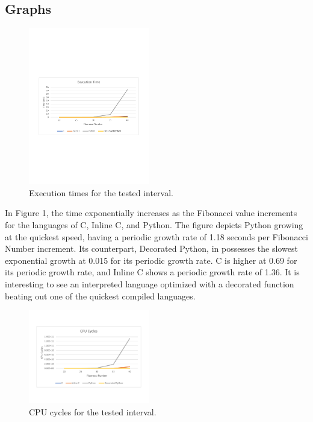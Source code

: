 \documentclass{sig-alternate}
\begin{document}
\subsection{Graphs}

\begin{figure}[h!]
	\centering
		\includegraphics[width=0.47\textwidth] {ExeTime.pdf}
	\caption{Execution times for the tested interval.}
	\label{Exe Times}
\end{figure}

In Figure 1, the time exponentially increases as the Fibonacci value increments for the languages of C, Inline C, and Python. The figure depicts Python growing at the quickest speed, having a periodic growth rate of 1.18 seconds per Fibonacci Number increment. Its counterpart, Decorated Python, in possesses the slowest exponential growth at 0.015 for its periodic growth rate. C is higher at 0.69 for its periodic growth rate, and Inline C shows a periodic growth rate of 1.36. It is interesting to see an interpreted language optimized with a decorated function beating out one of the quickest compiled languages.

\begin{figure}[ht]
	\centering
		\includegraphics[width=0.47\textwidth] {CPUcycles.pdf}
	\caption{CPU cycles for the tested interval.}
	\label{CPU Cycles}
\end{figure}
\end{document}
